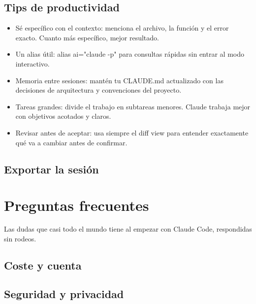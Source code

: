 \documentclass[11pt,a4paper]{book}
\begin{document}
\section{Tips de productividad}
\begin{itemize}\item Sé específico con el contexto: menciona el archivo, la función y el error exacto. Cuanto más específico, mejor resultado.\end{itemize}
\begin{itemize}\item Un alias útil: alias ai="claude -p" para consultas rápidas sin entrar al modo interactivo.\end{itemize}
\begin{itemize}\item Memoria entre sesiones: mantén tu CLAUDE.md actualizado con las decisiones de arquitectura y convenciones del proyecto.\end{itemize}
\begin{itemize}\item Tareas grandes: divide el trabajo en subtareas menores. Claude trabaja mejor con objetivos acotados y claros.\end{itemize}
\begin{itemize}\item Revisar antes de aceptar: usa siempre el diff view para entender exactamente qué va a cambiar antes de confirmar.\end{itemize}
\section{Exportar la sesión}
\chapter{Preguntas frecuentes}
Las dudas que casi todo el mundo tiene al empezar con Claude Code, respondidas sin rodeos.

\section{Coste y cuenta}
\section{Seguridad y privacidad}
\end{document}
